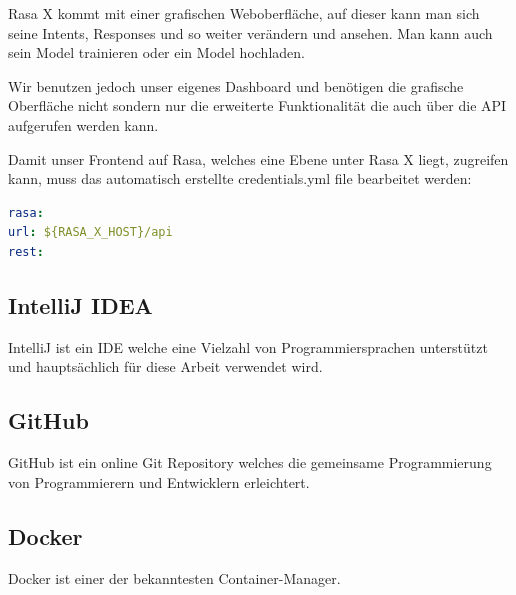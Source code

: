 Rasa X kommt mit einer grafischen Weboberfläche, auf dieser kann man sich seine Intents, Responses und so weiter verändern und ansehen.
Man kann auch sein Model trainieren oder ein Model hochladen.

Wir benutzen jedoch unser eigenes Dashboard und benötigen die grafische Oberfläche nicht sondern nur die erweiterte Funktionalität die auch über die API aufgerufen werden kann.

Damit unser Frontend auf Rasa, welches eine Ebene unter Rasa X liegt, zugreifen kann, muss das automatisch erstellte credentials.yml file bearbeitet werden:

\begin{lstlisting}[language=yml]
rasa:
url: ${RASA_X_HOST}/api
rest:
\end{lstlisting}

\subsection{IntelliJ IDEA}
IntelliJ ist ein IDE welche eine Vielzahl von Programmiersprachen unterstützt und hauptsächlich für diese Arbeit verwendet wird.

\subsection{GitHub}
GitHub ist ein online Git Repository welches die gemeinsame Programmierung von Programmierern und Entwicklern erleichtert.

\subsection{Docker}
Docker ist einer der bekanntesten Container-Manager.
